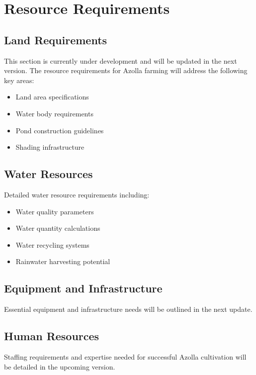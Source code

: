 \section{Resource Requirements}

\subsection{Land Requirements}

This section is currently under development and will be updated in the next version. The resource requirements for Azolla farming will address the following key areas:

\begin{itemize}
    \item Land area specifications
    \item Water body requirements
    \item Pond construction guidelines
    \item Shading infrastructure
\end{itemize}

\subsection{Water Resources}

Detailed water resource requirements including:
\begin{itemize}
    \item Water quality parameters
    \item Water quantity calculations
    \item Water recycling systems
    \item Rainwater harvesting potential
\end{itemize}

\subsection{Equipment and Infrastructure}

Essential equipment and infrastructure needs will be outlined in the next update.

\subsection{Human Resources}

Staffing requirements and expertise needed for successful Azolla cultivation will be detailed in the upcoming version.
